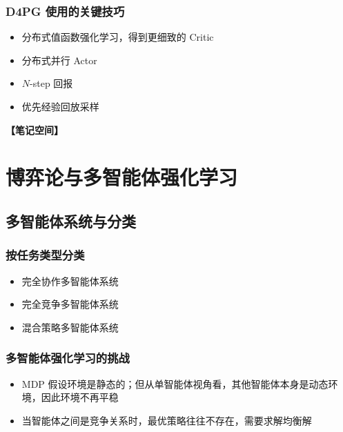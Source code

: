 \documentclass[12pt,a4paper]{article}
\newcommand{\notespace}[1][3cm]{%
  \vspace{#1}%
  \noindent\textbf{【笔记空间】}%
  \vspace{#1}%
}
\newcommand{\1}{\mathbf{1}}
\begin{document}
\subsubsection*{D4PG 使用的关键技巧}

\begin{itemize}[leftmargin=2em]
  \item 分布式值函数强化学习，得到更细致的 Critic
  \item 分布式并行 Actor
  \item $N$-step 回报
  \item 优先经验回放采样
\end{itemize}

\notespace[3cm]

\newpage

\section{博弈论与多智能体强化学习}

\subsection{多智能体系统与分类}

\subsubsection*{按任务类型分类}

\begin{itemize}[leftmargin=2em]
  \item 完全协作多智能体系统
  \item 完全竞争多智能体系统
  \item 混合策略多智能体系统
\end{itemize}

\subsubsection*{多智能体强化学习的挑战}

\begin{keybox}
\begin{itemize}[leftmargin=1.5em]
  \item MDP 假设环境是静态的；但从单智能体视角看，其他智能体本身是动态环境，因此环境不再平稳
  \item 当智能体之间是竞争关系时，最优策略往往不存在，需要求解均衡解
\end{itemize}
\end{keybox}
\end{document}
